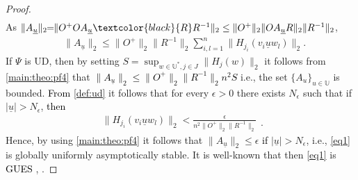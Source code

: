 \documentclass[journal,twoside,web]{ieeecolor}
\begin{document}
\begin{proof}
\begin{equation*}
\begin{split}
      \end{split}  
    \end{equation*}
    As
    $\|A_{\underline{u}}\|_2\!\!=\!\!\|O^{+}OA_{\underline{u}} \textcolor{black}{R} R^{-1}\|_2 \le  \|O^{+}\|_2 \|OA_{\underline{u}}R\|_2 \|R^{-1}\|_2$,
    \begin{equation}
    \label{main:theo:pf4}
    \begin{split}
     & \|A_{\underline{u}}\|_2
     \le \|O^{+}\|_2 \|R^{-1}\|_2 
        \sum_{i,l=1}^{n}  \|H_{j_i}(v_i\underline{u}w_l)\|_2.
    \end{split}
  \end{equation}
  If $\Psi$ is UD, then by setting $S=\sup_{w \in \mathbb{U}^{*}, j \in J} \|H_j(w)\|_2$
  it follows from \eqref{main:theo:pf4} that 
  \textcolor{black}{$\|A_{\underline{u}}\|_2 \le \|O^{+}\|_2 \|R^{-1}\|_2 n^2S$} 
  i.e., the set $\{ A_{u} \}_{u \in \mathbb{U}}$ is bounded. 
   \textcolor{black}{From} \eqref{def:ud}
   it follows that
    for every $\epsilon > 0$ there exists $N_{\epsilon}$ such that
    if $|\underline{u}| > N_{\epsilon}$, \textcolor{black}{then} 
    \[  \begin{split}
       \|H_{j_i}(v_i\underline{u}w_l)\|_2 < \frac{\epsilon}{n^2 \|O^{+}\|_2 \|R^{-1}\|_2 }
      \end{split}.
    \]
  Hence, by using \eqref{main:theo:pf4} it follows that 
  \( \|A_{\underline{u}}\|_2 \le \epsilon \)
  \textcolor{black}{if} $|\underline{u}| > N_{\epsilon}$, i.e.,
  \eqref{eq1} is globally uniformly asymptotically stable. 
  It is well-known that then \eqref{eq1} is \textcolor{black}{GUES}
  \cite[Theorem 2.15]{Sun:Book}, \cite{Piatnitsky}.

\end{proof}
\end{document}

